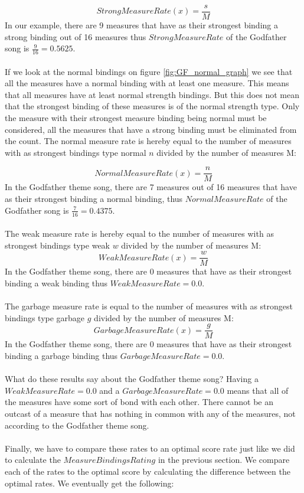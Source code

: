 \documentclass[a4paper]{article}
\begin{document}
\[ StrongMeasureRate(x) = \frac{\textit{s}}{\textit{M} } \]
In our example, there are 9 measures that have as their strongest binding a strong binding out of 16 measures thus $StrongMeasureRate$ of the Godfather song is $\frac{9}{16} =  0.5625$.
\\\\
If we look at the normal bindings on figure \ref{fig:GF_normal_graph} we see that all the measures have a normal binding with at least one measure. This means that all measures have at least normal strength bindings. But this does not mean that the strongest binding of these measures is of the normal strength type. Only the measure with their strongest measure binding being normal must be considered, all the measures that have a strong binding must be eliminated from the count. The normal measure rate is hereby equal to the number of measures with as strongest bindings type normal $n$ divided by the number of measures M:

\[ NormalMeasureRate(x) = \frac{\textit{n}}{\textit{M} } \]
In the Godfather theme song, there are 7 measures out of 16 measures that have as their strongest binding a normal binding, thus $NormalMeasureRate$ of the Godfather song is $\frac{7}{16} =  0.4375$.
\\\\
The weak measure rate is hereby equal to the number of measures with as strongest bindings type weak $w$ divided by the number of measures M:
\[ WeakMeasureRate(x) = \frac{\textit{w}}{\textit{M} } \]
In the Godfather theme song, there are 0 measures that have as their strongest binding a weak binding thus $WeakMeasureRate =  0.0$.
\\\\
The garbage measure rate is equal to the number of measures with as strongest bindings type garbage $g$ divided by the number of measures M:
\[ GarbageMeasureRate(x) = \frac{\textit{g}}{\textit{M} } \]
In the Godfather theme song, there are 0 measures that have as their strongest binding a garbage binding thus $GarbageMeasureRate =  0.0$.
\\\\
What do these results say about the Godfather theme song? Having a $WeakMeasureRate =  0.0$ and a $GarbageMeasureRate =  0.0$ means that all of the measures  have some sort of bond with each other. There cannot be an outcast of a measure that has nothing in common with any of the measures, not according to the Godfather theme song. 
\\\\
Finally, we have to compare these rates to an optimal score rate just like we did to calculate the $MeasureBindingsRating$ in the previous section. We compare each of the rates to the optimal score by calculating the difference between the optimal rates. We eventually get the following:
\end{document}
